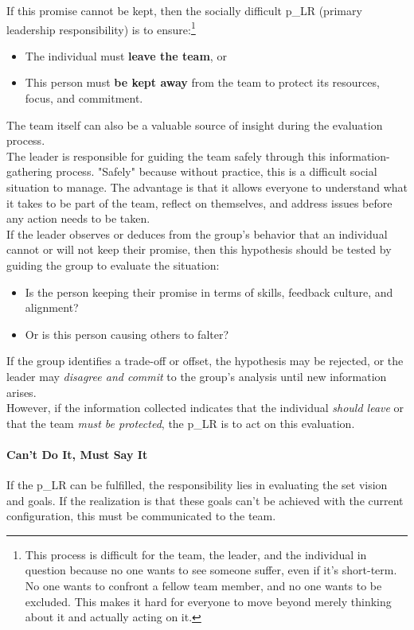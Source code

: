 If this promise cannot be kept, then the socially difficult \gls{p_LR} (primary leadership responsibility) is to ensure:\footnote{
	This process is difficult for the team, the leader, and the individual in question because no one wants to see someone suffer, even if it's short-term. No one wants to confront a fellow team member, and no one wants to be excluded. This makes it hard for everyone to move beyond merely thinking about it and actually acting on it.
}
\begin{itemize}
	\item The individual must \textbf{leave the team}, or
	\item This person must \textbf{be kept away} from the team to protect its resources, focus, and commitment.
\end{itemize}
The team itself can also be a valuable source of insight during the evaluation process.\\

The leader is responsible for guiding the team safely through this information-gathering process. "Safely" because without practice, this is a difficult social situation to manage. The advantage is that it allows everyone to understand what it takes to be part of the team, reflect on themselves, and address issues before any action needs to be taken.\\

If the leader observes or deduces from the group's behavior that an individual cannot or will not keep their promise, then this hypothesis should be tested by guiding the group to evaluate the situation:
\begin{itemize}
	\item Is the person keeping their promise in terms of skills, feedback culture, and alignment?
	\item Or is this person causing others to falter?
\end{itemize}
If the group identifies a trade-off or offset, the hypothesis may be rejected, or the leader may \textit{disagree and commit} to the group's analysis until new information arises.\\

However, if the information collected indicates that the individual \textit{should leave} or that the team \textit{must be protected}, the \gls{p_LR} is to act on this evaluation.

\paragraph{Can't Do It, Must Say It}
If the \gls{p_LR} can be fulfilled, the responsibility lies in evaluating the set vision and goals. If the realization is that these goals can't be achieved with the current configuration, this must be communicated to the team.\\


